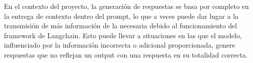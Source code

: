 En el contexto del proyecto, la generación de respuestas se basa por completo en la entrega de contexto 
dentro del prompt, lo que a veces puede dar lugar a la transmisión de más información de la necesaria 
debido al funcionamiento del framework de Langchain. Esto puede llevar a situaciones en las que el modelo, 
influenciado por la información incorrecta o adicional proporcionada, genere respuestas que no reflejan 
un output con una respuesta en su totalidad correcta.




